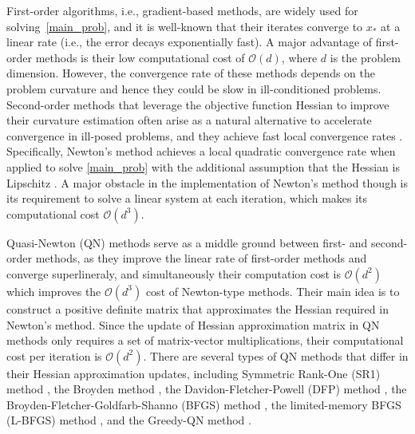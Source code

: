 \documentclass[11pt]{article}
\numberwithin{assumption}{section}
\numberwithin{remark}{section}
\numberwithin{theorem}{section}
\begin{document}
First-order algorithms, i.e., gradient-based methods, are widely used for solving~\eqref{main_prob}, and it is well-known that their iterates converge to $x_*$ at a linear rate (i.e., the error decays exponentially fast). %
A major advantage of first-order methods is their low computational cost of  $\mathcal{O}(d)$, where $d$ is the problem dimension. However, the convergence rate of these methods depends on the problem curvature and hence they could be slow in ill-conditioned problems. Second-order methods that leverage the objective function Hessian to improve their curvature estimation often arise as a natural alternative to accelerate convergence in ill-posed problems, and they achieve fast local convergence rates \citep{bennett1916newton,ortega1970iterative,conn2000trust,nesterov2006cubic}. Specifically, Newton's method achieves a local quadratic convergence rate when applied to solve \eqref{main_prob} with the additional assumption that the Hessian is Lipschitz \citep[Chapter 9]{boyd04}. A major obstacle in the implementation of Newton's method though is its requirement to solve a linear system at each iteration, which makes its computational cost $\mathcal{O}(d^3)$.

Quasi-Newton (QN) methods serve as a middle ground between first- and second-order methods, as they improve the linear rate of first-order methods and converge superlineraly, and simultaneously their computation cost is $\mathcal{O}(d^2)$ which improves the $\mathcal{O}(d^3)$ cost of Newton-type methods. Their main idea is to construct a positive definite matrix that approximates the Hessian required in Newton's method. Since the update of Hessian approximation matrix in QN methods only requires a set of matrix-vector multiplications, their computational cost per iteration is $\mathcal{O}(d^2)$. There are several types of QN methods that differ in their Hessian approximation updates, including Symmetric Rank-One (SR1) method \citep{conn1991convergence}, the Broyden method \citep{broyden1965class,Broyden,gay1979some}, the Davidon-Fletcher-Powell (DFP) method \citep{davidon1959variable,fletcher1963rapidly}, the Broyden-Fletcher-Goldfarb-Shanno (BFGS) method \citep{broyden1970convergence,fletcher1970new,goldfarb1970family,shanno1970conditioning}, the limited-memory BFGS (L-BFGS) method \citep{nocedal1980updating,liu1989limited}, and the Greedy-QN method \citep{rodomanov2020greedy}. 
\end{document}
